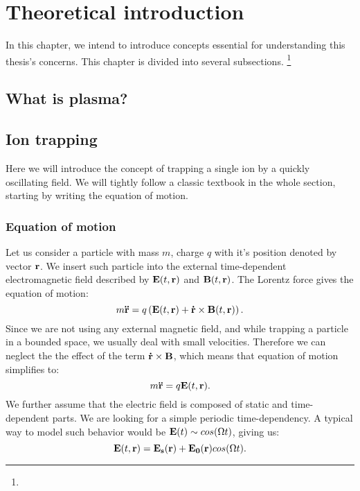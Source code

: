 \chapter{Theoretical introduction}
\label{chap:refs}

In this chapter, we intend to introduce concepts essential for understanding this thesis's concerns. This chapter is divided into several subsections. \footnote{} 

\section{What is plasma?}

\section{Ion trapping}
Here we will introduce the concept of trapping a single ion by a quickly oscillating field. We will tightly follow a classic textbook \cite{gerlich1992inhomogeneous} in the whole section, starting by writing the equation of motion.
\subsection{Equation of motion}
Let us consider a particle with mass $m$, charge $q$ with it's position denoted by vector $\vb{r}$. We insert such particle into the external time-dependent electromagnetic field described by $\vb{E}(t,\vb{r})$ and $\vb{B}(t,\vb{r})$. The Lorentz force gives the equation of motion:
\begin{equation}
	m \vb{\ddot{r}} = q \left(\vb{E}(t,\vb{r}) + \vb{\dot{r}} \times \vb{B}(t,\vb{r})\right).
\end{equation}
Since we are not using any external magnetic field, and while trapping a particle in a bounded space, we usually deal with small velocities. Therefore we can neglect the the effect of the term $\vb{\dot{r}} \times \vb{B}$, which means that equation of motion simplifies to:
\begin{equation}
	\label{equation of motion}
	m \vb{\ddot{r}} = q \vb{E}(t,\vb{r}).
\end{equation}
We further assume that the electric field is composed of static and time-dependent parts. We are looking for a simple periodic time-dependency. A typical way to model such behavior would be $\vb{E}(t) \sim cos(\Omega t)$, giving us:
\begin{equation}
	\vb{E}(t,\vb{r}) = \vb{E_s}(\vb{r}) + \vb{E_0}(\vb{r}) cos(\Omega t).
\end{equation}
